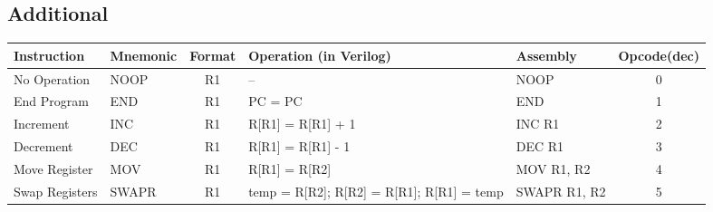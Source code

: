 \documentclass[a4paper,10pt]{article}
\begin{document}
\subsection*{Additional}
\begin{tabular}{>{\raggedright\arraybackslash\hangindent=0.2cm\hangafter=1}p{2.5cm}lc>{\raggedright\arraybackslash}p{5cm}lc}
\toprule
Instruction & Mnemonic & Format & Operation (in Verilog) & Assembly & Opcode(dec) \\
\midrule
No Operation & NOOP & R1 & -- & NOOP & 0\\
End Program & END & R1 & PC = PC & END & 1\\
Increment & INC & R1 & R[R1] = R[R1] + 1 & INC R1 & 2\\
Decrement & DEC & R1 & R[R1] = R[R1] - 1 & DEC R1 & 3\\
Move Register & MOV & R1 & R[R1] = R[R2] & MOV R1, R2 & 4\\
Swap Registers & SWAPR & R1 & temp = R[R2]; R[R2] = R[R1]; R[R1] = temp & SWAPR R1, R2 & 5\\
\bottomrule
\end{tabular}
\end{document}
